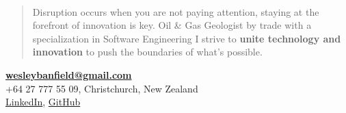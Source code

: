 \documentclass[]{friggeri-cv}
\begin{document}
~
\begin{quote}
\large
Disruption occurs when you are not paying attention, staying at the forefront of innovation is key. Oil \& Gas Geologist by trade with a specialization in Software Engineering I strive to \textbf{unite technology and innovation} to push the boundaries of what’s possible.
\end{quote}

\begin{center}
\vspace{6pt}
\href{mailto:wesleybanfield@gmail.com}{\textbf{wesleybanfield@gmail.com}}
\\+64 27 777 55 09, Christchurch, New Zealand
\vspace{3pt}
\\\href{https://www.linkedin.com/in/wesleybanfield/}{LinkedIn},
\href{https://github.com/WesleyTheGeolien}{GitHub}
\end{center}
\end{document}
